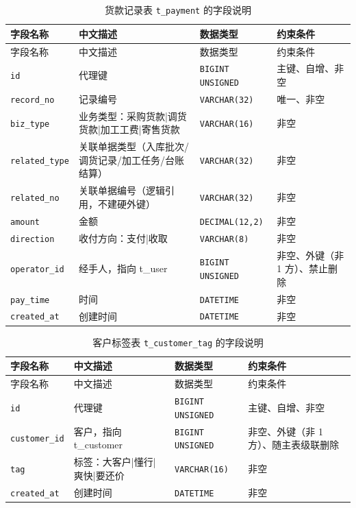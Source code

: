 \documentclass[12pt, a4paper]{ctexart}
\newcommand{\code}[1]{\texttt{\small #1}}
\begin{document}
\begin{longtable}{@{}p{3.1cm} p{4.5cm} p{2.4cm} p{4.5cm}@{}}
\caption{货款记录表 \code{t\_payment} 的字段说明}\label{tab:f-t-payment}\\
\toprule
字段名称 & 中文描述 & 数据类型 & 约束条件 \\
\midrule
\endfirsthead
\toprule
字段名称 & 中文描述 & 数据类型 & 约束条件 \\
\midrule
\endhead
\bottomrule
\endlastfoot
\code{id} & 代理键 & \code{BIGINT UNSIGNED} & 主键、自增、非空 \\
\code{record\_no} & 记录编号 & \code{VARCHAR(32)} & 唯一、非空 \\
\code{biz\_type} & 业务类型：采购货款|调货货款|加工工费|寄售货款 & \code{VARCHAR(16)} & 非空 \\
\code{related\_type} & 关联单据类型（入库批次/调货记录/加工任务/台账结算） & \code{VARCHAR(32)} & 非空 \\
\code{related\_no} & 关联单据编号（逻辑引用，不建硬外键） & \code{VARCHAR(32)} & 非空 \\
\code{amount} & 金额 & \code{DECIMAL(12,2)} & 非空 \\
\code{direction} & 收付方向：支付|收取 & \code{VARCHAR(8)} & 非空 \\
\code{operator\_id} & 经手人，指向 t\_user & \code{BIGINT UNSIGNED} & 非空、外键（非 1 方）、禁止删除 \\
\code{pay\_time} & 时间 & \code{DATETIME} & 非空 \\
\code{created\_at} & 创建时间 & \code{DATETIME} & 非空 \\
\end{longtable}

\begin{longtable}{@{}p{3.1cm} p{4.5cm} p{2.4cm} p{4.5cm}@{}}
\caption{客户标签表 \code{t\_customer\_tag} 的字段说明}\label{tab:f-t-customer-tag}\\
\toprule
字段名称 & 中文描述 & 数据类型 & 约束条件 \\
\midrule
\endfirsthead
\toprule
字段名称 & 中文描述 & 数据类型 & 约束条件 \\
\midrule
\endhead
\bottomrule
\endlastfoot
\code{id} & 代理键 & \code{BIGINT UNSIGNED} & 主键、自增、非空 \\
\code{customer\_id} & 客户，指向 t\_customer & \code{BIGINT UNSIGNED} & 非空、外键（非 1 方）、随主表级联删除 \\
\code{tag} & 标签：大客户|懂行|爽快|要还价 & \code{VARCHAR(16)} & 非空 \\
\code{created\_at} & 创建时间 & \code{DATETIME} & 非空 \\
\end{longtable}
\end{document}
